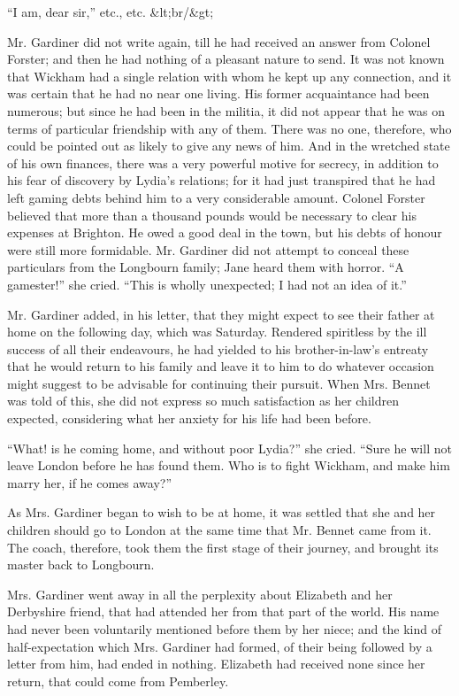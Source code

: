\documentclass[10pt]{book}
\begin{document}
    “I am, dear sir,” etc., etc.
    &lt;br/&gt;

   Mr. Gardiner did not write again, till he had received an answer from
Colonel Forster; and then he had nothing of a pleasant nature to send.
It was not known that Wickham had a single relation with whom he kept up
any connection, and it was certain that he had no near one living. His
former acquaintance had been numerous; but since he had been in the
militia, it did not appear that he was on terms of particular friendship
with any of them. There was no one, therefore, who could be pointed out
as likely to give any news of him. And in the wretched state of his own
finances, there was a very powerful motive for secrecy, in addition to
his fear of discovery by Lydia’s relations; for it had just transpired
that he had left gaming debts behind him to a very considerable amount.
Colonel Forster believed that more than a thousand pounds would be
necessary to clear his expenses at Brighton. He owed a good deal
   in the
town, but his debts of honour were still more formidable. Mr. Gardiner
did not attempt to conceal these particulars from the Longbourn family;
Jane heard them with horror. “A gamester!” she cried. “This is wholly
unexpected; I had not an idea of it.”
  

   Mr. Gardiner added, in his letter, that they might expect to see their
father at home on the following day, which was Saturday. Rendered
spiritless by the ill success of all their endeavours, he had yielded to
his brother-in-law’s entreaty that he would return to his family and
leave it to him to do whatever occasion might suggest to be advisable
for continuing their pursuit. When Mrs. Bennet was told of this, she did
not express so much satisfaction as her children expected, considering
what her anxiety for his life had been before.
  

   “What! is he coming home, and without poor Lydia?” she cried. “Sure he
will not leave London before he has found them. Who is to fight Wickham,
and make him marry her, if he comes away?”
  

   As Mrs. Gardiner began to wish to be at home, it was settled that she
and her children should go to London at the same time that Mr. Bennet
came from it. The coach, therefore, took them the first stage of their
journey, and brought its master back to Longbourn.
  

   Mrs. Gardiner went away in all the perplexity about Elizabeth and her
Derbyshire friend, that had attended her from that part of the world.
His name had never been voluntarily mentioned before them by her niece;
and the kind of half-expectation which Mrs. Gardiner had formed, of
their being followed by a letter from him, had ended in nothing.
Elizabeth had received none since her return, that could come from
Pemberley.
  
\end{document}
